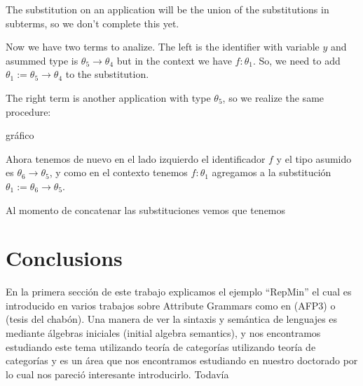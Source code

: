 \documentclass[a4paper,10pt]{article}
\begin{document}
  The substitution on an application will be the union of the substitutions in subterms, so we don't complete this
  yet.
  \medskip

  Now we have two terms to analize. The left is the identifier with variable $y$ and asummed type is $\theta_5 \rightarrow \theta_4$
  but in the context we have $f:\theta_1$. So, we need to add $\theta_1 := \theta_5 \rightarrow \theta_4$ to the substitution.
  
  The right term is another application with type $\theta_5$, so we realize the same procedure:
  
  \begin{center}
   gráfico
  \end{center}
   
  Ahora tenemos de nuevo en el lado izquierdo el identificador $f$ y el tipo asumido es $\theta_6 \rightarrow \theta_5$,
  y como en el contexto tenemos $f:\theta_1$ agregamos a la substitución $\theta_1 := \theta_6 \rightarrow \theta_5$.
  
  Al momento de concatenar las substituciones vemos que tenemos 
  
  
  \section{Conclusions}
  
  En la primera sección de este trabajo explicamos el ejemplo ``RepMin'' el cual es introducido en varios
  trabajos sobre Attribute Grammars como en (AFP3) o (tesis del chabón). Una manera de ver la sintaxis y semántica
  de lenguajes es mediante álgebras iniciales (initial algebra semantics), y nos encontramos estudiando este tema
  utilizando teoría de categorías
  utilizando teoría de categorías y es un área que nos encontramos 
  estudiando en nuestro doctorado por lo cual nos pareció interesante introducirlo. Todavía 
  
  
  
   
\end{document}

